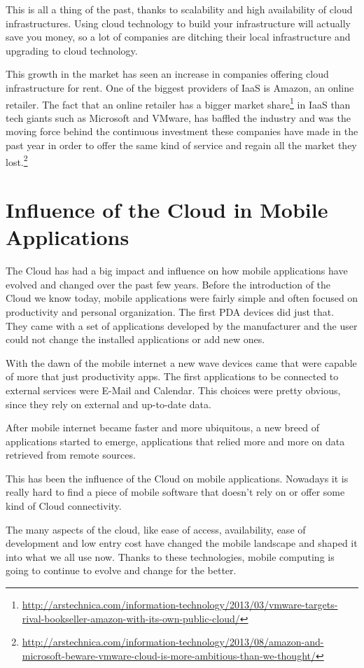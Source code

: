 This is all a thing of the past, thanks to scalability and high availability of cloud infrastructures. Using cloud technology to build your infrastructure will actually save you money, so a lot of companies are ditching their local infrastructure and upgrading to cloud technology.

This growth in the market has seen an increase in companies offering cloud infrastructure for rent. One of the biggest providers of \ac{IaaS} is Amazon, an online retailer. The fact that an online retailer has a bigger market share\footnote{\url{http://arstechnica.com/information-technology/2013/03/vmware-targets-rival-bookseller-amazon-with-its-own-public-cloud/}} in \ac{IaaS} than tech giants such as Microsoft and VMware, has baffled the industry and was the moving force behind the continuous investment these companies have made in the past year in order to offer the same kind of service and regain all the market they lost.\footnote{\url{http://arstechnica.com/information-technology/2013/08/amazon-and-microsoft-beware-vmware-cloud-is-more-ambitious-than-we-thought/}} 

\section{Influence of the Cloud in Mobile Applications}
The Cloud has had a big impact and influence on how mobile applications have evolved and changed over the past few years. Before the introduction of the Cloud we know today, mobile applications were fairly simple and often focused on productivity and personal organization. The first \ac{PDA} devices did just that. They came with a set of applications developed by the manufacturer and the user could not change the installed applications or add new ones. 

With the dawn of the mobile internet a new wave devices came that were capable of more that just productivity apps. The first applications to be connected to external services were E-Mail and Calendar. This choices were pretty obvious, since they rely on external and up-to-date data.

After mobile internet became faster and more ubiquitous, a new breed of applications started to emerge, applications that relied more and more on data retrieved from remote sources.

This has been the influence of the Cloud on mobile applications. Nowadays it is really hard to find a piece of mobile software that doesn't rely on or offer some kind of Cloud connectivity.  

The many aspects of the cloud, like ease of access, availability, ease of development and low entry cost have changed the mobile landscape and shaped it into what we all use now. Thanks to these technologies, mobile computing is going to continue to evolve and change for the better.





    





